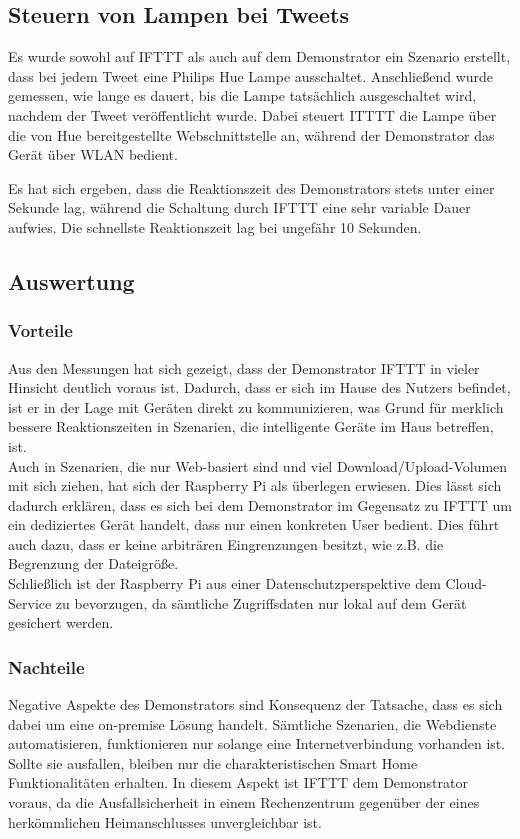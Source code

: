 \subsection{Steuern von Lampen bei Tweets}
Es wurde sowohl auf IFTTT als auch auf dem Demonstrator ein Szenario erstellt, dass bei jedem Tweet eine Philips Hue Lampe ausschaltet. Anschließend wurde gemessen, wie lange es dauert, bis die Lampe tatsächlich ausgeschaltet wird, nachdem der Tweet veröffentlicht wurde. Dabei steuert ITTTT die Lampe über die von Hue bereitgestellte Webschnittstelle an, während der Demonstrator das Gerät über WLAN bedient.

Es hat sich ergeben, dass die Reaktionszeit des Demonstrators stets unter einer Sekunde lag, während die Schaltung durch IFTTT eine sehr variable Dauer aufwies. Die schnellste Reaktionszeit lag bei ungefähr 10 Sekunden.


\subsection{Auswertung}
\subsubsection{Vorteile}
Aus den Messungen hat sich gezeigt, dass der Demonstrator IFTTT in vieler Hinsicht deutlich voraus ist. Dadurch, dass er sich im Hause des Nutzers befindet, ist er in der Lage mit Geräten direkt zu kommunizieren, was Grund für merklich bessere Reaktionszeiten in Szenarien, die intelligente Geräte im Haus betreffen, ist.\\

Auch in Szenarien, die nur Web-basiert sind und viel Download/Upload-Volumen mit sich ziehen, hat sich der Raspberry Pi als überlegen erwiesen. Dies lässt sich dadurch erklären, dass es sich bei dem Demonstrator im Gegensatz zu IFTTT um ein dediziertes Gerät handelt, dass nur einen konkreten User bedient. Dies führt auch dazu, dass er keine arbiträren Eingrenzungen besitzt, wie z.B. die Begrenzung der Dateigröße.\\

Schließlich ist der Raspberry Pi aus einer Datenschutzperspektive dem Cloud-Service zu bevorzugen, da sämtliche Zugriffsdaten nur lokal auf dem Gerät gesichert werden.

\subsubsection{Nachteile}
Negative Aspekte des Demonstrators sind Konsequenz der Tatsache, dass es sich dabei um eine on-premise Lösung handelt. Sämtliche Szenarien, die Webdienste automatisieren, funktionieren nur solange eine Internetverbindung  vorhanden ist. Sollte sie ausfallen, bleiben nur die charakteristischen Smart Home Funktionalitäten erhalten. In diesem Aspekt ist IFTTT dem Demonstrator voraus, da die Ausfallsicherheit in einem Rechenzentrum gegenüber der eines herkömmlichen Heimanschlusses unvergleichbar ist.\\


